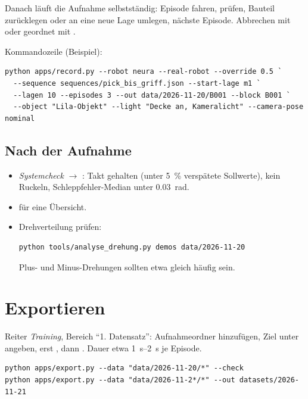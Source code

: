 Danach läuft die Aufnahme selbstständig: Episode fahren, prüfen, Bauteil zurücklegen oder
an eine neue Lage umlegen, nächste Episode. Abbrechen mit  oder geordnet mit
.

Kommandozeile (Beispiel):
\begin{lstlisting}[style=ps]
python apps/record.py --robot neura --real-robot --override 0.5 `
  --sequence sequences/pick_bis_griff.json --start-lage m1 `
  --lagen 10 --episodes 3 --out data/2026-11-20/B001 --block B001 `
  --object "Lila-Objekt" --light "Decke an, Kameralicht" --camera-pose nominal
\end{lstlisting}

\subsection{Nach der Aufnahme}
\begin{itemize}
  \item \emph{Systemcheck} $\rightarrow$ : Takt gehalten (unter
    \SI{5}{\percent} verspätete Sollwerte), kein Ruckeln, Schleppfehler-Median unter
    \SI{0.03}{rad}.
  \item {} für eine Übersicht.
  \item Drehverteilung prüfen:
\begin{lstlisting}[style=ps]
python tools/analyse_drehung.py demos data/2026-11-20
\end{lstlisting}
    Plus- und Minus-Drehungen sollten etwa gleich häufig sein.
\end{itemize}


\section{Exportieren}
\label{sec:exportieren}

Reiter \emph{Training}, Bereich \enquote{1. Datensatz}: Aufnahmeordner hinzufügen, Ziel unter
 angeben, erst , dann . Dauer etwa
\SIrange{1}{2}{\second} je Episode.

\begin{lstlisting}[style=ps]
python apps/export.py --data "data/2026-11-20/*" --check
python apps/export.py --data "data/2026-11-2*/*" --out datasets/2026-11-21
\end{lstlisting}

